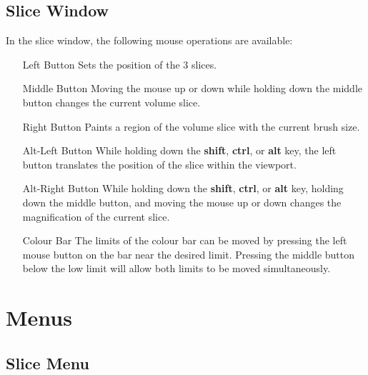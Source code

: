 \subsection{Slice Window}

In the slice window, the following mouse operations are available:

\begin{itemize}
\item[Left Button]  Sets the position of the 3 slices.
\item[Middle Button]  Moving the mouse up or down while holding down the
                      middle button changes the current volume slice.
\item[Right Button]  Paints a region of the volume slice with the current
                     brush size.
\item[Alt-Left Button]  While holding down the {\bf shift}, {\bf ctrl},
                        or {\bf alt} key, the left button translates the
                        position of the slice within the viewport.
\item[Alt-Right Button]  While holding down the {\bf shift}, {\bf ctrl},
                        or {\bf alt} key, holding down the middle button,
                        and moving the mouse up or down changes the
                        magnification of the current slice.
\item[Colour Bar]  The limits of the colour bar can be moved by pressing
                   the left mouse button on the bar near the desired limit.
                   Pressing the middle button below the low limit will allow
                   both limits to be moved simultaneously.
\end{itemize}

\section{Menus}

\subsection{Slice Menu}

